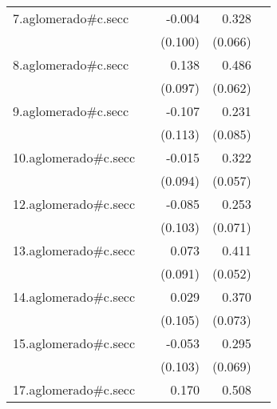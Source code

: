 {\begin{longtable}{l*{4}{D{.}{.}{-1}}}
\addlinespace
7.aglomerado#c.secc&                     &      -0.004         &       0.328\sym{***}&                     \\
            &                     &     (0.100)         &     (0.066)         &                     \\
\addlinespace
8.aglomerado#c.secc&                     &       0.138         &       0.486\sym{***}&                     \\
            &                     &     (0.097)         &     (0.062)         &                     \\
\addlinespace
9.aglomerado#c.secc&                     &      -0.107         &       0.231\sym{**} &                     \\
            &                     &     (0.113)         &     (0.085)         &                     \\
\addlinespace
10.aglomerado#c.secc&                     &      -0.015         &       0.322\sym{***}&                     \\
            &                     &     (0.094)         &     (0.057)         &                     \\
\addlinespace
12.aglomerado#c.secc&                     &      -0.085         &       0.253\sym{***}&                     \\
            &                     &     (0.103)         &     (0.071)         &                     \\
\addlinespace
13.aglomerado#c.secc&                     &       0.073         &       0.411\sym{***}&                     \\
            &                     &     (0.091)         &     (0.052)         &                     \\
\addlinespace
14.aglomerado#c.secc&                     &       0.029         &       0.370\sym{***}&                     \\
            &                     &     (0.105)         &     (0.073)         &                     \\
\addlinespace
15.aglomerado#c.secc&                     &      -0.053         &       0.295\sym{***}&                     \\
            &                     &     (0.103)         &     (0.069)         &                     \\
\addlinespace
17.aglomerado#c.secc&                     &       0.170         &       0.508\sym{***}&                     \\

\end{longtable}}
